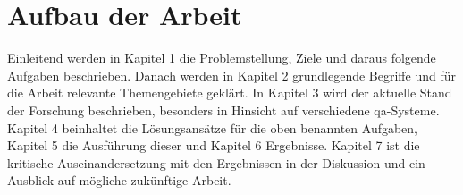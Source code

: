 \section{Aufbau der Arbeit}

Einleitend werden in Kapitel 1 die Problemstellung, Ziele und daraus folgende Aufgaben beschrieben.
Danach werden in Kapitel 2 grundlegende Begriffe und für die Arbeit relevante Themengebiete geklärt.
In Kapitel 3 wird der aktuelle Stand der Forschung beschrieben, besonders in Hinsicht auf verschiedene \acl*{qa}-Systeme.
Kapitel 4 beinhaltet die Lösungsansätze für die oben benannten Aufgaben, Kapitel 5 die Ausführung dieser und Kapitel 6 Ergebnisse.
Kapitel 7 ist die kritische Auseinandersetzung mit den Ergebnissen in der Diskussion und ein Ausblick auf mögliche zukünftige Arbeit.
